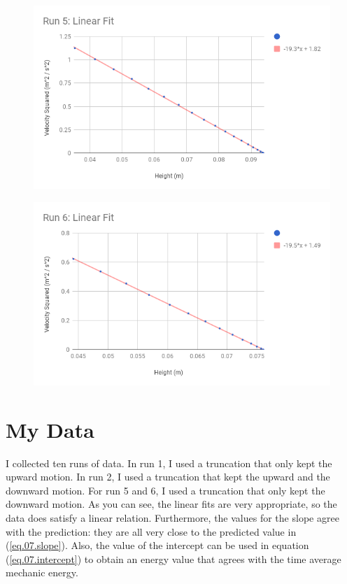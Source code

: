 \begin{figure} \label{figure.07.run.5.fit}
    \centering
    \includegraphics[scale=0.71]{image/07-mechanic/run-5-fit.png}
    \caption{}
\end{figure}
\begin{figure} \label{figure.07.run.6.fit}
    \centering
    \includegraphics[scale=0.71]{image/07-mechanic/run-6-fit.png}
    \caption{}
\end{figure}
\section{My Data}
I collected ten runs of data. In run 1, I used a truncation that only kept the upward motion. In run 2, I used a truncation that kept the upward and the downward motion. For run 5 and 6, I used a truncation that only kept the downward motion. As you can see, the linear fits are very appropriate, so the data does satisfy a linear relation. Furthermore, the values for the slope agree with the prediction: they are all very close to the predicted value in (\ref{eq.07.slope}). Also, the value of the intercept can be used in equation (\ref{eq.07.intercept}) to obtain an energy value that agrees with the time average mechanic energy.

